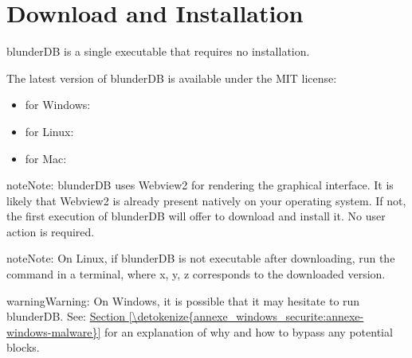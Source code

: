 \documentclass[letterpaper,10pt,english]{sphinxmanual}
\begin{document}
\section{Download and Installation}
\label{\detokenize{telecharge_install:telechargement-et-installation}}\label{\detokenize{telecharge_install::doc}}
\sphinxAtStartPar
blunderDB is a single executable that requires no installation.

\sphinxAtStartPar
The latest version of blunderDB is available under the MIT license:
\begin{itemize}
\item {} 
\sphinxAtStartPar
for Windows: 

\item {} 
\sphinxAtStartPar
for Linux: 

\item {} 
\sphinxAtStartPar
for Mac: 

\end{itemize}

\begin{sphinxadmonition}{note}{Note:}
\sphinxAtStartPar
blunderDB uses Webview2 for rendering the graphical interface. It is likely that Webview2 is already present natively on your operating system. If not, the first execution of blunderDB will offer to download and install it. No user action is required.
\end{sphinxadmonition}

\begin{sphinxadmonition}{note}{Note:}
\sphinxAtStartPar
On Linux, if blunderDB is not executable after downloading, run the command  in a terminal, where x, y, z corresponds to the downloaded version.
\end{sphinxadmonition}

\begin{sphinxadmonition}{warning}{Warning:}
\sphinxAtStartPar
On Windows, it is possible that it may hesitate to run blunderDB. See: \hyperref[\detokenize{annexe_windows_securite:annexe-windows-malware}]{Section \ref{\detokenize{annexe_windows_securite:annexe-windows-malware}}} for an explanation of why and how to bypass any potential blocks.
\end{sphinxadmonition}
\end{document}
